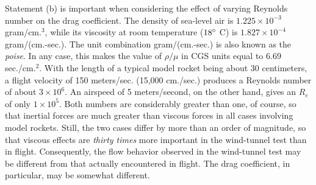 Statement (b) is important when considering the effect of varying Reynolds
number on the drag coefficient. The density of sea-level air is
$1.225 \times 10^{-3}$ gram/cm.$^{3}$, while its viscosity at room temperature
($18^{\circ}$ C) is $1.827 \times 10^{-4}$ gram/(cm.-sec.). The unit combination
gram/(cm.-sec.) is also known as the \emph{poise}. In any case, this makes the
value of $\rho/\mu$ in CGS units equal to 6.69 sec./cm.$^{2}$. With the length
of a typical model rocket being about 30 centimeters, a flight velocity of 150
meters/sec. (15,000 cm./sec.) produces a Reynolds number of about
$3 \times 10^{6}$. An airspeed of 5 meters/second, on the other hand, gives an
$R_e$ of only $1 \times 10^{5}$. Both numbers are considerably greater than one,
of course, so that inertial forces are much greater than viscous forces in all
cases involving model rockets. Still, the two cases differ by more than an
order of magnitude, so that viscous effects are \emph{thirty times} more
important in the wind-tunnel test than in flight. Consequently, the flow
behavior observed in the wind-tunnel test may be different from that actually
encountered in flight. The drag coefficient, in particular, may be somewhat
different.

